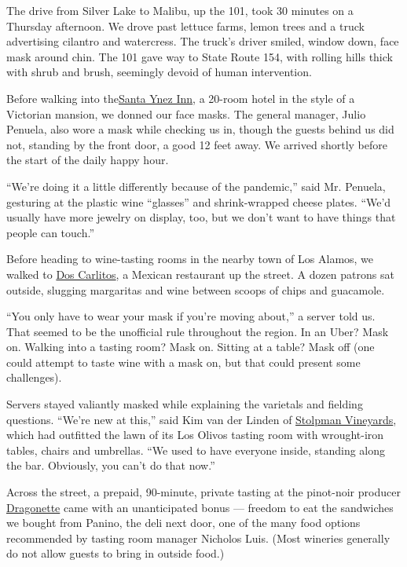 The drive from Silver Lake to Malibu, up the 101, took 30 minutes on a
Thursday afternoon. We drove past lettuce farms, lemon trees and a truck
advertising cilantro and watercress. The truck's driver smiled, window
down, face mask around chin. The 101 gave way to State Route 154, with
rolling hills thick with shrub and brush, seemingly devoid of human
intervention.

Before walking into the\href{https://santaynezinn.com/}{Santa Ynez Inn},
a 20-room hotel in the style of a Victorian mansion, we donned our face
masks. The general manager, Julio Penuela, also wore a mask while
checking us in, though the guests behind us did not, standing by the
front door, a good 12 feet away. We arrived shortly before the start of
the daily happy hour.

``We're doing it a little differently because of the pandemic,'' said
Mr. Penuela, gesturing at the plastic wine ``glasses'' and
shrink-wrapped cheese plates. ``We'd usually have more jewelry on
display, too, but we don't want to have things that people can touch.''

Before heading to wine-tasting rooms in the nearby town of Los Alamos,
we walked to \href{https://doscarlitos.com/}{Dos Carlitos}, a Mexican
restaurant up the street. A dozen patrons sat outside, slugging
margaritas and wine between scoops of chips and guacamole.

``You only have to wear your mask if you're moving about,'' a server
told us. That seemed to be the unofficial rule throughout the region. In
an Uber? Mask on. Walking into a tasting room? Mask on. Sitting at a
table? Mask off (one could attempt to taste wine with a mask on, but
that could present some challenges).

Servers stayed valiantly masked while explaining the varietals and
fielding questions. ``We're new at this,'' said Kim van der Linden of
\href{https://www.stolpmanvineyards.com/}{Stolpman Vineyards}, which had
outfitted the lawn of its Los Olivos tasting room with wrought-iron
tables, chairs and umbrellas. ``We used to have everyone inside,
standing along the bar. Obviously, you can't do that now.''

Across the street, a prepaid, 90-minute, private tasting at the
pinot-noir producer \href{https://dragonettecellars.com/}{Dragonette}
came with an unanticipated bonus --- freedom to eat the sandwiches we
bought from Panino, the deli next door, one of the many food options
recommended by tasting room manager Nicholos Luis. (Most wineries
generally do not allow guests to bring in outside food.)

